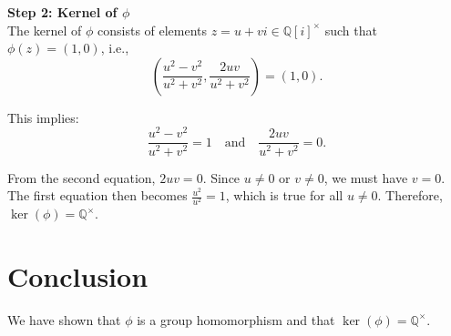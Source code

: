 \documentclass[12pt]{amsart}
\theoremstyle{definition}
\numberwithin{equation}{section}
\newcommand{\Q}{\mathbb{Q}}
\begin{document}
\begin{exercise}{2}
    \noindent \textbf{Step 2: Kernel of \(\phi \)}\\
    The kernel of \(\phi \) consists of elements \(z = u + vi \in \Q{[i]}^{\times}\) such that \(\phi(z) = (1,0)\), i.e.,
    \[
    \left(\frac{u^2 - v^2}{u^2 + v^2}, \frac{2uv}{u^2 + v^2}\right) = (1,0).
    \]

    This implies:
    \[
    \frac{u^2 - v^2}{u^2 + v^2} = 1 \quad \text{and} \quad \frac{2uv}{u^2 + v^2} = 0.
    \]

    From the second equation, \(2uv = 0\). Since \(u \neq 0\) or \(v \neq 0\), we must have \(v = 0\). The first equation then becomes \(\frac{u^2}{u^2} = 1\), which is true for all \(u \neq 0\). Therefore, \(\ker(\phi) = \Q^{\times}\).

    \section*{Conclusion}
    We have shown that \(\phi \) is a group homomorphism and that \(\ker(\phi) = \Q^{\times}\).

\end{exercise}
\newpage
\end{document}
